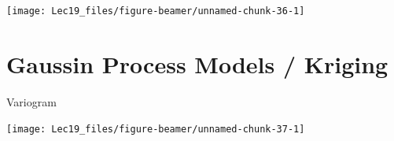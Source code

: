 \documentclass[11pt,ignorenonframetext,]{beamer}
\newenvironment{Shaded}{}{}
\newcommand{\DataTypeTok}[1]{\textcolor[rgb]{0.56,0.13,0.00}{#1}}
\newcommand{\DecValTok}[1]{\textcolor[rgb]{0.25,0.63,0.44}{#1}}
\newcommand{\KeywordTok}[1]{\textcolor[rgb]{0.00,0.44,0.13}{\textbf{#1}}}
\newcommand{\NormalTok}[1]{#1}
\newcommand{\OperatorTok}[1]{\textcolor[rgb]{0.40,0.40,0.40}{#1}}
\newcommand{\OtherTok}[1]{\textcolor[rgb]{0.00,0.44,0.13}{#1}}
\newcommand{\StringTok}[1]{\textcolor[rgb]{0.25,0.44,0.63}{#1}}
\let\oldShaded\Shaded
\let\endoldShaded\endShaded
\renewenvironment{Shaded}{\footnotesize\begin{spacing}{0.9}\oldShaded}{\endoldShaded\end{spacing}}
\let\oldverbatim\verbatim
\let\endoldverbatim\endverbatim
\newcommand{\scriptoutput}{
  \renewenvironment{Shaded}{\scriptsize\begin{spacing}{0.9}\oldShaded}{\endoldShaded\end{spacing}}
  \renewenvironment{verbatim}{\scriptsize\begin{spacing}{0.9}\oldverbatim}{\endoldverbatim\end{spacing}}
}
\begin{document}
\begin{frame}{}
\protect\hypertarget{section-3}{}

\begin{center}\texttt{[image: Lec19\_files/figure-beamer/unnamed-chunk-36-1]} \end{center}

\end{frame}

\hypertarget{gaussin-process-models-kriging}{%
\section{Gaussin Process Models /
Kriging}\label{gaussin-process-models-kriging}}

\begin{frame}[fragile]{Variogram}
\protect\hypertarget{variogram}{}

\scriptoutput

\begin{Shaded}
\end{Shaded}

\begin{center}\texttt{[image: Lec19\_files/figure-beamer/unnamed-chunk-37-1]} \end{center}

\end{frame}
\end{document}
